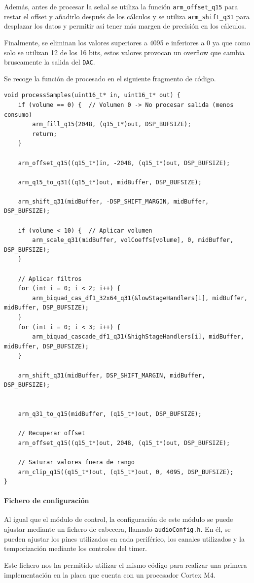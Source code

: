 Además, antes de procesar la señal se utiliza la función \texttt{arm\_offset\_q15} para restar el offset y añadirlo después de los cálculos y se utiliza \texttt{arm\_shift\_q31} para desplazar los datos y permitir así tener más margen de precisión en los cálculos. 

Finalmente, se eliminan los valores superiores a 4095 e inferiores a 0 ya que como solo se utilizan 12 de los 16 bits, estos valores provocan un overflow que cambia bruscamente la salida del \texttt{DAC}.

Se recoge la función de procesado en el siguiente fragmento de código.

\begin{lstlisting}[captionpos=t, caption={Función de procesado de audio}]
void processSamples(uint16_t* in, uint16_t* out) {
    if (volume == 0) {  // Volumen 0 -> No procesar salida (menos consumo)
        arm_fill_q15(2048, (q15_t*)out, DSP_BUFSIZE);
        return;
    }

    arm_offset_q15((q15_t*)in, -2048, (q15_t*)out, DSP_BUFSIZE);

    arm_q15_to_q31((q15_t*)out, midBuffer, DSP_BUFSIZE);

    arm_shift_q31(midBuffer, -DSP_SHIFT_MARGIN, midBuffer, DSP_BUFSIZE);

    if (volume < 10) {  // Aplicar volumen
        arm_scale_q31(midBuffer, volCoeffs[volume], 0, midBuffer, DSP_BUFSIZE);
    }

    // Aplicar filtros
    for (int i = 0; i < 2; i++) {
        arm_biquad_cas_df1_32x64_q31(&lowStageHandlers[i], midBuffer, midBuffer, DSP_BUFSIZE);
    }
    for (int i = 0; i < 3; i++) {
        arm_biquad_cascade_df1_q31(&highStageHandlers[i], midBuffer, midBuffer, DSP_BUFSIZE);
    }

    arm_shift_q31(midBuffer, DSP_SHIFT_MARGIN, midBuffer, DSP_BUFSIZE);


    arm_q31_to_q15(midBuffer, (q15_t*)out, DSP_BUFSIZE);

    // Recuperar offset
    arm_offset_q15((q15_t*)out, 2048, (q15_t*)out, DSP_BUFSIZE);

    // Saturar valores fuera de rango 
    arm_clip_q15((q15_t*)out, (q15_t*)out, 0, 4095, DSP_BUFSIZE);
}
\end{lstlisting}

\paragraph{Fichero de configuración}

Al igual que el módulo de control, la configuración de este módulo se puede ajustar mediante un fichero de cabecera, llamado \texttt{audioConfig.h}. En él, se pueden ajustar los pines utilizados en cada periférico, los canales utilizados y la temporización mediante los controles del timer.

Este fichero nos ha permitido utilizar el mismo código para realizar una primera implementación en la placa que cuenta con un procesador Cortex M4.